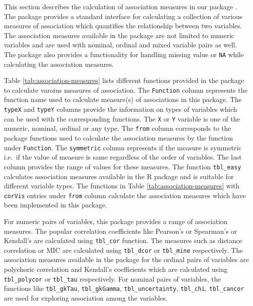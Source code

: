 This section describes the calculation of association measures in our
package . The package provides a standard interface for
calculating a collection of various measures of association which
quantifies the relationship between two variables. The association
measures available in the package are not limited to numeric variables
and are used with nominal, ordinal and mixed variable pairs as well. The
package also provides a functionality for handling missing value or
\texttt{NA} while calculating the association measures.

Table \ref{tab:association-measures} lists different functions provided
in the package to calculate varoius measures of association. The
\texttt{Function} column represents the function name used to calculate
measure(s) of associations in this package. The \texttt{typeX} and
\texttt{typeY} columns provide the information on types of variables
which can be used with the corresponding functions. The \texttt{X} or
\texttt{Y} variable is one of the numeric, nominal, ordinal or any type.
The \texttt{from} column corresponds to the package functions used to
calculate the association measures by the function under
\texttt{Function}. The \texttt{symmetric} column represents if the
measure is symmetric i.e.~if the value of measure is same regardless of
the order of variables. The last column provides the range of values for
these measures. The function \texttt{tbl\_easy} calculates association
measures available in the R package  and is
suitable for different variable types. The functions in Table
\ref{tab:association-measures} with \texttt{corVis} entries under
\texttt{from} column calculate the association measures which have been
implemented in this package.

For numeric pairs of variables, this package provides a range of
association measures. The popular correlation coefficients like
Pearson's or Spearman's or Kendall's are calculated using
\texttt{tbl\_cor} function. The measures such as distance correlation or
MIC are calculated using \texttt{tbl\_dcor} or \texttt{tbl\_mine}
respectively. The association measures available in the package for the
ordinal pairs of variables are polychoric correlation and Kendall's
coefficients which are calculated using \texttt{tbl\_polycor} or
\texttt{tbl\_tau} respectively. For nominal pairs of variables, the
functions like \texttt{tbl\_gkTau}, \texttt{tbl\_gkGamma},
\texttt{tbl\_uncertainty}, \texttt{tbl\_chi}, \texttt{tbl\_cancor} are
used for exploring association among the variables.

